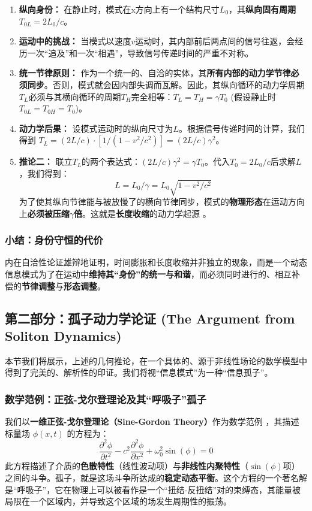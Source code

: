 \documentclass[11pt, a4paper]{article}
\begin{document}
\begin{enumerate}
    \item \textbf{纵向身份：} 在静止时，模式在x方向上有一个结构尺寸$L_0$，其\textbf{纵向固有周期 $T_{0L} = 2L_0 / c$}。
    \item \textbf{运动中的挑战：} 当模式以速度$v$运动时，其内部前后两点间的信号往返，会经历一次“追及”和一次“相遇”，导致信号传递时间的严重不对称。
    \item \textbf{统一节律原则：} 作为一个统一的、自洽的实体，其\textbf{所有内部的动力学节律必须同步}。否则，模式就会因内部失调而瓦解。因此，其纵向循环的动力学周期$T_L$必须与其横向循环的周期$T_H$完全相等：$T_L = T_H = \gamma T_0$ (假设静止时$T_{0L} = T_{0H} = T_0$)。
    \item \textbf{动力学后果：} 设模式运动时的纵向尺寸为$L$。根据信号传递时间的计算，我们得到 $T_L = (2L/c) \cdot [1 / (1 - v^2/c^2)] = (2L/c) \gamma^2$。
    \item \textbf{推论二：} 联立$T_L$的两个表达式：$(2L/c) \gamma^2 = \gamma T_0$。代入$T_0=2L_0/c$后求解$L$，我们得到：
    \[
    L = L_0 / \gamma = L_0 \sqrt{1 - v^2/c^2}
    \]
    为了使其纵向节律能与被放慢了的横向节律同步，模式的\textbf{物理形态}在运动方向上\textbf{必须被压缩$\gamma$倍}。这就是\textbf{长度收缩}的动力学起源 \cite{Einstein1905}。
\end{enumerate}

\subsubsection{小结：身份守恒的代价}

内在自洽性论证雄辩地证明，时间膨胀和长度收缩并非独立的现象，而是一个动态信息模式为了在运动中\textbf{维持其“身份”的统一与和谐}，而必须同时进行的、相互补偿的\textbf{节律调整}与\textbf{形态调整}。

\subsection*{第二部分：孤子动力学论证 (The Argument from Soliton Dynamics)}

本节我们将展示，上述的几何推论，在一个具体的、源于非线性场论的数学模型中得到了完美的、解析性的印证。我们将视“信息模式”为一种“信息孤子”。

\subsubsection{数学范例：正弦-戈尔登理论及其“呼吸子”孤子}

我们以\textbf{一维正弦-戈尔登理论（Sine-Gordon Theory）}作为数学范例 \cite{DrazinJohnson1989}，其描述标量场 $\phi(x,t)$ 的方程为：
\[
\frac{\partial^2\phi}{\partial t^2} - c^2\frac{\partial^2\phi}{\partial x^2} + \omega_0^2\sin(\phi) = 0
\]
此方程描述了介质的\textbf{色散特性}（线性波动项）与\textbf{非线性内聚特性}（$\sin(\phi)$项）之间的斗争。孤子，就是这场斗争所达成的\textbf{稳定动态平衡}。这个方程的一个著名解是“呼吸子”，它在物理上可以被看作是一个“扭结-反扭结”对的束缚态，其能量被局限在一个区域内，并导致这个区域的场发生周期性的振荡。
\end{document}
